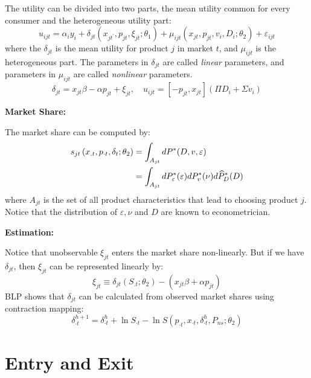 \documentclass{book}
\theoremstyle{plain}
\theoremstyle{definition}
\begin{document}
The utility can be divided into two parts, the mean utility common for every consumer and the heterogeneous utility part:
\[u _ { i j t } = \alpha _ { i } y _ { i } + \delta _ { j t } \left( x _ { j t ^ { \prime } } , p _ { j t } , \xi _ { j t } ; \theta _ { 1 } \right) + \mu _ { i j t } \left( x _ { j t } , p _ { j t } , v _ { i } , D _ { i } ; \theta _ { 2 } \right) + \varepsilon _ { i j t }\]
where the $\delta_{jt}$ is the mean utility for product $j$ in market $t$, and $\mu_{ijt}$ is the heterogeneous part. 
The parameters in $\delta_{jt}$ are called \textit{linear} parameters, and parameters in $\mu_{ijt}$ are called \textit{nonlinear} parameters.
\[\delta _ { j t } = x _ { j t } \beta - \alpha p _ { j t } + \xi _ { j t } , \quad u _ { i j t } = \left[ - p _ { j t } , x _ { j t } \right] \left( \Pi D _ { i } + \Sigma v _ { i } \right)\]

\textbf{Market Share:}

The market share can be computed by:
\begin{align}
	s _ { j t } \left( x _ { . t } , p _ { \cdot t } , \delta _ { t } ; \theta _ { 2 } \right) &= \int _ { A _ { j t } } d P ^ { * } ( D , v , \varepsilon ) \notag \\
	&= \int _ { A _ { j t } } d P _ { \varepsilon } ^ { * } ( \varepsilon ) d P _ { v } ^ { * } ( \nu ) d \widehat { P } _ { D } ^ { * } ( D )
\end{align}
where $A_{jt}$ is the set of all product characteristics that lead to choosing product $j$. Notice that the distribution of $\varepsilon, \nu$ and $D$ are known to econometrician.


\textbf{Estimation:}

Notice that unobservable $\xi_{jt}$ enters the market share non-linearly. But if we have $\delta_{jt}$, then $\xi_{jt}$ can be represented linearly by:
\[\xi_{jt}\equiv \delta _ { j t } \left( S _ { . t } ; \theta _ { 2 } \right) - \left( x _ { j t } \beta + \alpha p _ { j t } \right)\]
BLP shows that $\delta_{jt}$ can be calculated from observed market shares using contraction mapping:
\[\delta _ { \cdot t } ^ { h + 1 } = \delta _ { \cdot t } ^ { h } + \ln S _ { \cdot t } - \ln S \left( p _ { \cdot t } , x _ { \cdot t } , \delta _ { \cdot t } ^ { h } , P _ { n s } ; \theta _ { 2 } \right)\]








\chapter{Entry and Exit} %
\label{cha:entry_and_exit}
\end{document}
